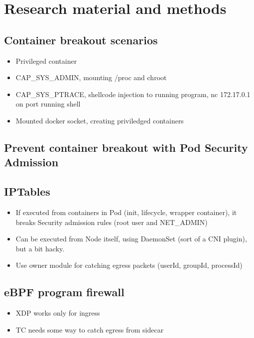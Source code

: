 \documentclass[english,12pt,a4paper,pdftex,sci,utf8]{aaltothesis}
\begin{document}
\clearpage

\section{Research material and methods} \label{section-methods}

\subsection{Container breakout scenarios}

\cite{bui2015analysis}

\begin{itemize}
  \item Privileged container
  \item CAP\_SYS\_ADMIN, mounting /proc and chroot
  \item CAP\_SYS\_PTRACE, shellcode injection to running program, nc 172.17.0.1 on port running shell
  \item Mounted docker socket, creating priviledged containers
\end{itemize}

\subsection{Prevent container breakout with Pod Security Admission}

\subsection{IPTables}

\begin{itemize}
  \item If executed from containers in Pod (init, lifecycle, wrapper container), it breaks Security admission rules (root user and NET\_ADMIN)
  \item Can be executed from Node itself, using DaemonSet (sort of a CNI plugin), but a bit hacky.
  \item Use owner module for catching egress packets (userId, groupId, processId)
\end{itemize}

\subsection{eBPF program firewall}

\begin{itemize}
  \item XDP works only for ingress
  \item TC needs some way to catch egress from sidecar
\end{itemize}
\end{document}
